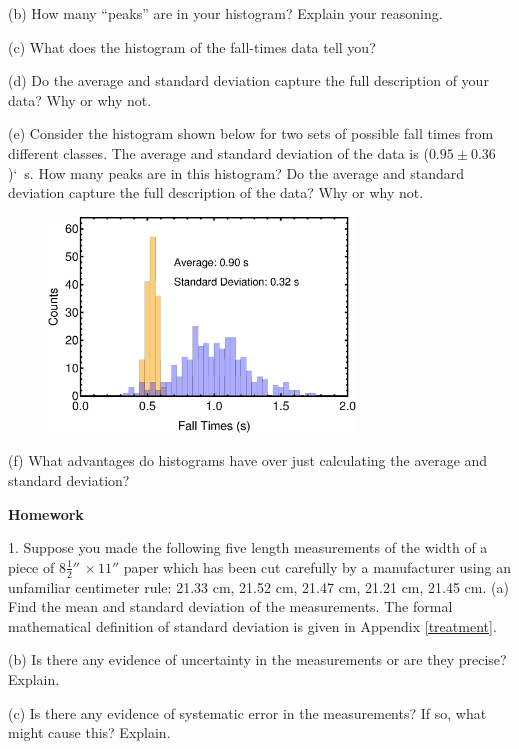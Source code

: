(b) How many ``peaks'' are in your histogram? Explain your reasoning.
\answerspace{10mm}

(c) What does the histogram of the fall-times data tell you?
\answerspace{15mm}

(d) Do the average and standard deviation capture the full description of your data? Why or why not.
\answerspace{15mm}

(e) Consider the histogram shown below for two sets of possible fall times from different classes. 
The average and standard deviation of the data is ($0.95\pm 0.36$)`~s. How many peaks are in this
histogram? Do the average and standard deviation capture the full description of the data? Why or why not.

\begin{figure}[hb]
\includegraphics[height=2.25in]{measurement_uncertainty/histogram_color.eps}\label{SampleHist1}
\end{figure}

(f) What advantages do histograms have over just calculating the average and standard deviation?
\answerspace{20mm}

\textbf{Homework} 

1. Suppose you made the following five length measurements of the width of a
piece of $8\frac{1}{2} {}''\, \times 11''$ paper which has been cut carefully by
a manufacturer using an unfamiliar centimeter rule: 21.33 cm, 21.52 cm, 21.47
cm, 21.21 cm, 21.45 cm. (a) Find the mean and standard deviation of the measurements.
The formal mathematical definition of standard deviation 
is given in Appendix \ref{treatment}. 
\answerspace{30mm}

\pagebreak[2]
(b) Is there any evidence of uncertainty in the measurements or are they precise?
Explain. 
\answerspace{20mm}

(c) Is there any evidence of systematic error in the measurements? If so, what
might cause this? Explain.
\answerspace{20mm}

